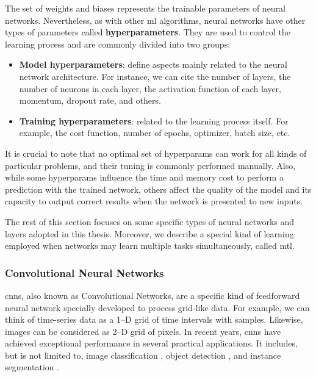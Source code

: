 The set of weights and biases represents the trainable parameters of neural networks. Nevertheless, as with other \acs{ml} algorithms, neural networks have other types of parameters called \textbf{hyperparameters}. They are used to control the learning process and are commonly divided into two groups:

\begin{itemize}
\item \textbf{Model hyperparameters}: define aspects mainly related to the neural network architecture. For instance, we can cite the number of layers, the number of neurons in each layer, the activation function of each layer, momentum, dropout rate, and others.

\item \textbf{Training hyperparameters}: related to the learning process itself. For example, the cost function, number of epochs, optimizer, batch size, etc.
\end{itemize}

It is crucial to note that no optimal set of hyperparams can work for all kinds of particular problems, and their tuning is commonly performed manually. Also, while some hyperparams influence the time and memory cost to perform a prediction with the trained network, others affect the quality of the model and its capacity to output correct results when the network is presented to new inputs.

The rest of this section focuses on some specific types of neural networks and layers adopted in this thesis. Moreover, we describe a special kind of learning employed when networks may learn multiple tasks simultaneously, called \acl{mtl}.


\subsubsection{Convolutional Neural Networks}

\acfp{cnn}, also known as Convolutional Networks, are a specific kind of feedforward neural network specially developed to process grid-like data. For example, we can think of time-series data as a 1--D grid of time intervals with samples. Likewise, images can be considered as 2--D grid of pixels. In recent years, \acsp{cnn} have achieved exceptional performance in several practical applications. It includes, but is not limited to, image classification \citep{li2014medical, guo2017simple, paoletti2018new}, object detection \citep{cai2016unified, wu2017squeezedet}, and instance segmentation \citep{wang2020solov2, xu2020convolutional, zhang2020mask}.

